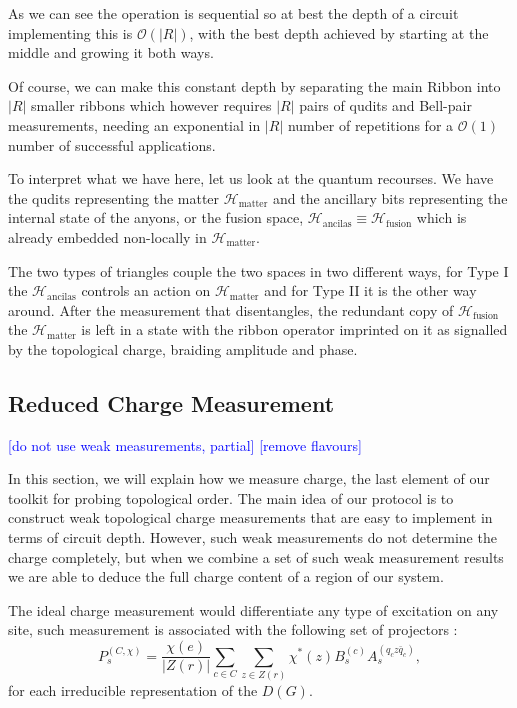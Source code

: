 \documentclass[two column]{article}
\newcommand{\caro}[1]{\textcolor{red}{[#1]}}
\newcommand{\jovan}[1]{\textcolor{blue}{[#1]}}
\begin{document}
As we can see the operation is sequential so at best the depth of a circuit implementing this is $\mathcal{O}(|R|)$, with the best depth achieved by starting at the middle and growing it both ways.

Of course, we can make this constant depth by separating the main Ribbon into $|R|$ smaller ribbons which however requires $|R|$ pairs of qudits and Bell-pair measurements, needing an exponential  in $|R|$ number of repetitions for a $\mathcal{O}(1)$ number of successful applications.

To interpret what we have here, let us look at the quantum recourses. We have the qudits representing the matter $\mathcal{H}_{\text{matter}}$ and the ancillary bits representing the internal state of the anyons, or the fusion space, $\mathcal{H}_{\text{ancilas}} \equiv \mathcal{H}_{\text{fusion}}$ which is already embedded non-locally in  $\mathcal{H}_{\text{matter}}$.

The two types of triangles couple the two spaces in two different ways, for Type I the $\mathcal{H}_{\text{ancilas}}$ controls an action on $\mathcal{H}_{\text{matter}}$ and for Type II it is the other way around. After the measurement that disentangles, the redundant copy of $\mathcal{H}_{\text{fusion}}$ the $\mathcal{H}_{\text{matter}}$ is left in a state with the ribbon operator imprinted on it as signalled by the topological charge, braiding amplitude and phase.

\subsection{Reduced Charge Measurement}

\jovan{do not use weak measurements, partial}
\jovan{remove flavours}

In this section, we will explain how we measure charge, the last element of our toolkit for probing topological order. The main idea of our protocol is to construct weak topological charge measurements that are easy to implement in terms of circuit depth. However, such weak measurements do not determine the charge completely, but when we combine a set of such weak measurement results we are able to deduce the full charge content of a region of our system.

The ideal charge measurement would differentiate any type of excitation on any site, such measurement is associated with the following set of projectors \cite{}:
\begin{equation}
    P_s^{(C, \chi)} = \frac{\chi(e)}{|Z(r)|}\sum_{c \in C}\sum_{z \in Z(r)}\chi^*(z)B_s^{(c)}A_s^{(q_c z \bar{q}_c)},
\end{equation}
for each irreducible representation of the $D(G)$.
\end{document}
